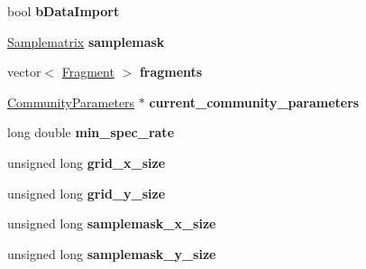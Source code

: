 \begin{DoxyCompactItemize}
\item 
bool {\bfseries b\+Data\+Import}\hypertarget{group___community_objects_ab6496c803e44395f4490f6301fc15a13}{}\label{group___community_objects_ab6496c803e44395f4490f6301fc15a13}

\item 
\hyperlink{class_samplematrix}{Samplematrix} {\bfseries samplemask}\hypertarget{group___community_objects_ac7434119a77086e3b38a4a94c8fbff01}{}\label{group___community_objects_ac7434119a77086e3b38a4a94c8fbff01}

\item 
vector$<$ \hyperlink{struct_fragment}{Fragment} $>$ {\bfseries fragments}\hypertarget{group___community_objects_a8a17909b92a0cec3b63cec41e92796cb}{}\label{group___community_objects_a8a17909b92a0cec3b63cec41e92796cb}

\item 
\hyperlink{struct_community_parameters}{Community\+Parameters} $\ast$ {\bfseries current\+\_\+community\+\_\+parameters}\hypertarget{group___community_objects_a77e925f82bee5441d8ec45406066dcfb}{}\label{group___community_objects_a77e925f82bee5441d8ec45406066dcfb}

\item 
long double {\bfseries min\+\_\+spec\+\_\+rate}\hypertarget{group___community_objects_a9dc6f7d4ab75b382be85c2b74edac6b7}{}\label{group___community_objects_a9dc6f7d4ab75b382be85c2b74edac6b7}

\item 
unsigned long {\bfseries grid\+\_\+x\+\_\+size}\hypertarget{group___community_objects_a383dba82c8c76bf5c130c2bf4ac057e5}{}\label{group___community_objects_a383dba82c8c76bf5c130c2bf4ac057e5}

\item 
unsigned long {\bfseries grid\+\_\+y\+\_\+size}\hypertarget{group___community_objects_a308d12fa4ef95015860d4181b075c93f}{}\label{group___community_objects_a308d12fa4ef95015860d4181b075c93f}

\item 
unsigned long {\bfseries samplemask\+\_\+x\+\_\+size}\hypertarget{group___community_objects_a960bb6bb58eaec017d36d16cb3a3bc8a}{}\label{group___community_objects_a960bb6bb58eaec017d36d16cb3a3bc8a}

\item 
unsigned long {\bfseries samplemask\+\_\+y\+\_\+size}\hypertarget{group___community_objects_a10722b2fe8855460946f04f0ae69fd74}{}\label{group___community_objects_a10722b2fe8855460946f04f0ae69fd74}


\end{DoxyCompactItemize}
